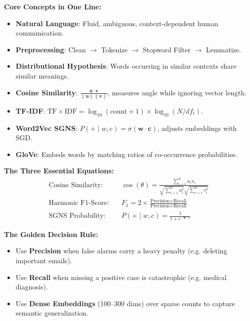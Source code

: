 \documentclass[a4paper,11pt]{article}
\newcommand{\calloutlabel}[1]{\MakeUppercase{#1}}
\begin{document}
\newpage
\begin{tcolorbox}[quiet={accent}{white},
  borderline north={0.4pt}{0pt}{hairline},
  borderline south={0.4pt}{0pt}{hairline},
  title={\upshape\calloutlabel{The One-Page Pocket Card}}, fontupper=\normalsize]

\textbf{Core Concepts in One Line:}
\begin{itemize}
  \item \textbf{Natural Language}: Fluid, ambiguous, context-dependent human communication.
  \item \textbf{Preprocessing}: Clean $\rightarrow$ Tokenize $\rightarrow$ Stopword Filter $\rightarrow$ Lemmatize.
  \item \textbf{Distributional Hypothesis}: Words occurring in similar contexts share similar meanings.
  \item \textbf{Cosine Similarity}: $\frac{\mathbf{u} \cdot \mathbf{v}}{\|\mathbf{u}\| \|\mathbf{v}\|}$, measures angle while ignoring vector length.
  \item \textbf{TF-IDF}: $\text{TF} \times \text{IDF} = \log_{10}(\text{count}+1) \times \log_{10}(N / df_t)$.
  \item \textbf{Word2Vec SGNS}: $P(+ \mid w, c) = \sigma(\mathbf{w} \cdot \mathbf{c})$, adjusts embeddings with SGD.
  \item \textbf{GloVe}: Embeds words by matching ratios of co-occurrence probabilities.
\end{itemize}

\vspace{6pt}
\textbf{The Three Essential Equations:}
\begin{align*}
\text{Cosine Similarity:} \quad &\cos(\theta) = \frac{\sum_{i=1}^d u_i v_i}{\sqrt{\sum_{i=1}^d u_i^2} \sqrt{\sum_{i=1}^d v_i^2}} \\
\text{Harmonic F1-Score:} \quad &F_1 = 2 \times \frac{\text{Precision} \times \text{Recall}}{\text{Precision} + \text{Recall}} \\
\text{SGNS Probability:} \quad &P(+ \mid w, c) = \frac{1}{1 + e^{-\mathbf{w} \cdot \mathbf{c}}}
\end{align*}

\vspace{6pt}
\textbf{The Golden Decision Rule:}
\begin{itemize}
  \item Use \textbf{Precision} when false alarms carry a heavy penalty (e.g. deleting important emails).
  \item Use \textbf{Recall} when missing a positive case is catastrophic (e.g. medical diagnosis).
  \item Use \textbf{Dense Embeddings} (100--300 dims) over sparse counts to capture semantic generalization.
\end{itemize}
\end{tcolorbox}
\end{document}
